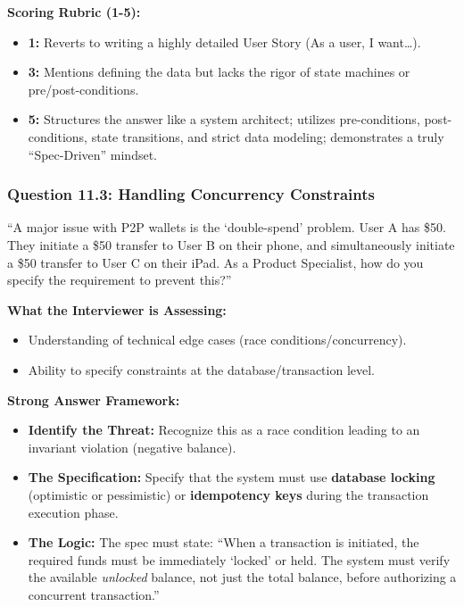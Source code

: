 \textbf{Scoring Rubric (1-5):}

\begin{itemize}
\tightlist
\item
  \textbf{1:} Reverts to writing a highly detailed User Story (As a
  user, I want\ldots).
\item
  \textbf{3:} Mentions defining the data but lacks the rigor of state
  machines or pre/post-conditions.
\item
  \textbf{5:} Structures the answer like a system architect; utilizes
  pre-conditions, post-conditions, state transitions, and strict data
  modeling; demonstrates a truly ``Spec-Driven'' mindset.
\end{itemize}

\subsubsection{Question 11.3: Handling Concurrency
Constraints}\label{question-11.3-handling-concurrency-constraints}

``A major issue with P2P wallets is the `double-spend' problem. User A
has \$50. They initiate a \$50 transfer to User B on their phone, and
simultaneously initiate a \$50 transfer to User C on their iPad. As a
Product Specialist, how do you specify the requirement to prevent
this?''

\textbf{What the Interviewer is Assessing:}

\begin{itemize}
\tightlist
\item
  Understanding of technical edge cases (race conditions/concurrency).
\item
  Ability to specify constraints at the database/transaction level.
\end{itemize}

\textbf{Strong Answer Framework:}

\begin{itemize}
\tightlist
\item
  \textbf{Identify the Threat:} Recognize this as a race condition
  leading to an invariant violation (negative balance).
\item
  \textbf{The Specification:} Specify that the system must use
  \textbf{database locking} (optimistic or pessimistic) or
  \textbf{idempotency keys} during the transaction execution phase.
\item
  \textbf{The Logic:} The spec must state: ``When a transaction is
  initiated, the required funds must be immediately `locked' or held.
  The system must verify the available \emph{unlocked} balance, not just
  the total balance, before authorizing a concurrent transaction.''
\end{itemize}

